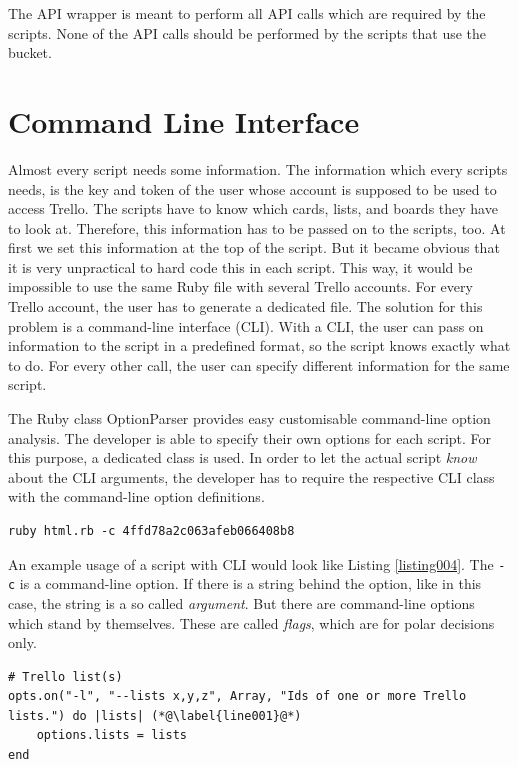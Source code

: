  The API wrapper is meant to perform all API calls which are required by the scripts. None of the API calls should be performed by the scripts that use the bucket.


\section{Command Line Interface}\label{cli}
Almost every script needs some information. The information which every scripts needs, is the key and token of the user whose account is supposed to be used to access Trello. The scripts have to know which cards, lists, and boards they have to look at. Therefore, this information has to be passed on to the scripts, too. At first we set this information at the top of the script. But it became obvious that it is very unpractical to hard code this in each script. This way, it would be impossible to use the same Ruby file with several Trello accounts. For every Trello account, the user has to generate a dedicated file. The solution for this problem is a command-line interface (CLI). With a CLI, the user can pass on information to the script in a predefined format, so the script knows exactly what to do. For every other call, the user can specify different information for the same script.

The Ruby class OptionParser\cite{ruby:optionparser} provides easy customisable command-line option analysis. The developer is able to specify their own options for each script. For this purpose, a dedicated class is used. 
In order to let the actual script \emph{know} about the CLI arguments, the developer has to require the respective CLI class with the command-line option definitions.

\begin{lstlisting}[aboveskip=1\baselineskip, style=bash, caption=Example usage of a script with CLI., label=listing004]
ruby html.rb -c 4ffd78a2c063afeb066408b8
\end{lstlisting}

An example usage of a script with CLI would look like Listing \ref{listing004}. The \texttt{-c} is a command-line option. If there is a string behind the option, like in this case, the string is a so called \emph{argument}. But there are command-line options which stand by themselves. These are called \emph{flags}, which are for polar decisions only.

\begin{lstlisting}[aboveskip=1\baselineskip, caption=Definition of a command-line option, label=listing002]
# Trello list(s)
opts.on("-l", "--lists x,y,z", Array, "Ids of one or more Trello lists.") do |lists| (*@\label{line001}@*)
	options.lists = lists
end
\end{lstlisting}

